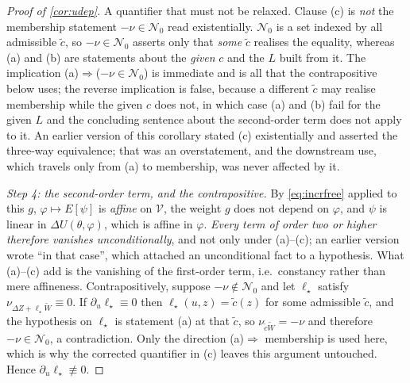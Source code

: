 \begin{proof}[Proof of \cref{cor:udep}]
A quantifier that must not be relaxed. Clause (c) is \emph{not} the membership statement
$-\nu\in\mathcal N_0$ read existentially. $\mathcal N_0$ is a set indexed by all admissible $\tilde c$,
so $-\nu\in\mathcal N_0$ asserts only that \emph{some} $\tilde c$ realises the equality, whereas (a) and
(b) are statements about the \emph{given} $c$ and the $L$ built from it. The implication
(a)$\Rightarrow$($-\nu\in\mathcal N_0$) is immediate and is all that the contrapositive below uses; the
reverse implication is false, because a different $\tilde c$ may realise membership while the given $c$
does not, in which case (a) and (b) fail for the given $L$ and the concluding sentence about the
second-order term does not apply to it. An earlier version of this corollary stated (c) existentially and
asserted the three-way equivalence; that was an overstatement, and the downstream use, which travels
only from (a) to membership, was never affected by it.

\emph{Step 4: the second-order term, and the contrapositive.}
By \eqref{eq:incrfree} applied to this $g$, $\varphi\mapsto E[\psi]$ is \emph{affine} on $\mathcal V$, 
the weight $g$ does not depend on $\varphi$, and $\psi$ is linear in $\Delta U(\theta,\varphi)$, which is
affine in $\varphi$. \emph{Every term of order two or higher therefore vanishes unconditionally}, and not
only under (a)--(c); an earlier version wrote ``in that case'', which attached an unconditional fact to a
hypothesis. What (a)--(c) add is the vanishing of the first-order term, i.e.\ constancy rather than mere
affineness. Contrapositively, suppose $-\nu\notin\mathcal N_0$ and let
$\ell_\star$ satisfy $\nu_{\Delta Z+\ell_\star\widetilde W}\equiv0$. If $\partial_u\ell_\star\equiv0$
then $\ell_\star(u,z)=\tilde c(z)$ for some admissible $\tilde c$, and the hypothesis on $\ell_\star$ is
statement (a) at that $\tilde c$, so $\nu_{\tilde c\widetilde W}=-\nu$ and therefore
$-\nu\in\mathcal N_0$, a contradiction. Only the direction (a)$\Rightarrow$ membership is used
here, which is why the corrected quantifier in (c) leaves this argument untouched. Hence
$\partial_u\ell_\star\not\equiv0$.
\end{proof}

